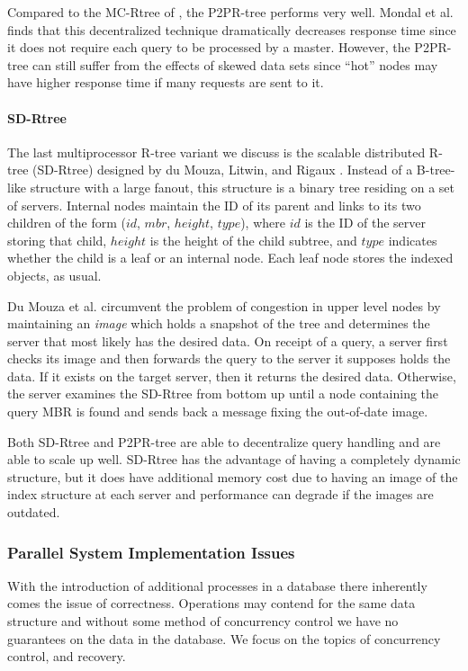 Compared to the MC-Rtree of \cite{schnitzer1999master}, the P2PR-tree performs
very well. Mondal et al. finds that this decentralized technique 
dramatically decreases response time since it does not require each query to be 
processed by a master. However, the P2PR-tree can
still suffer from the effects of skewed data sets since ``hot'' nodes may have
higher response time if many requests are sent to it. 

\paragraph{SD-Rtree}
The last multiprocessor R-tree variant we discuss is the scalable distributed 
R-tree (SD-Rtree) designed by du Mouza, Litwin, and Rigaux \cite{du2007sd}. 
Instead of a B-tree-like structure with a large
fanout, this structure is a binary tree residing on a set of servers.
Internal nodes maintain the ID of its parent and links to its two children of 
the form ($id$, $mbr$, $height$, $type$), where $id$ is the ID of the server 
storing that child, $height$ is the height of the child subtree, and $type$ 
indicates whether the child is a leaf or an internal node. Each leaf node stores 
the indexed objects, as usual.

Du Mouza et al. \cite{du2007sd} circumvent the problem of congestion in 
upper level nodes by 
maintaining an \emph{image} which holds a snapshot of the tree and determines 
the server that most likely has the desired data. On receipt of a query, a 
server first checks its image and then forwards the query to the server it 
supposes holds the data. If it exists on the target server, then it returns the
desired data. Otherwise, the server examines the SD-Rtree from bottom up until a 
node containing the query MBR is found and sends back a message fixing the 
out-of-date image. %

Both SD-Rtree and P2PR-tree are able to decentralize query handling and are able
to scale up well. SD-Rtree has the advantage of having a completely dynamic 
structure, but it does have additional memory cost due to having an image of the 
index structure at each server and performance can degrade if the images are 
outdated.

\subsubsection{Parallel System Implementation Issues}
With the introduction of additional processes in a database there inherently
comes the issue of correctness. Operations may contend for the same data 
structure and without some method of concurrency control we have no guarantees
on the data in the database. We focus on the topics of concurrency control, 
and recovery.

